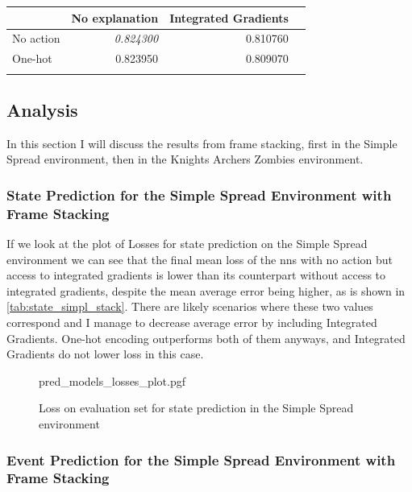 \documentclass[UKenglish]{uiomasterthesis}
\begin{document}
\begin{center}
\label{tab:state_kaz_knight_stack}
\begin{tabular}{lrrr}
\toprule
 & No explanation & Integrated Gradients \\
\midrule
No action & \textit{0.824300} & 0.810760 \\
One-hot & 0.823950 & 0.809070 \\
\bottomrule
\addlinespace[2pt]
\multicolumn{3}{l}{\textsuperscript{***}$p<0.001$, 
  \textsuperscript{**}$p<0.01$, 
  \textsuperscript{*}$p<0.05$}
\end{tabular}
\end{center}


\subsection{Analysis}
In this section I will discuss the results from frame stacking, first in the Simple Spread environment, then in the Knights Archers Zombies environment.


\subsubsection{State Prediction for the Simple Spread Environment with Frame Stacking}

If we look at the plot of Losses for state prediction on the Simple Spread environment we can see that the final mean loss of the \acp{nn} with no action but access to integrated gradients is lower than its counterpart without access to integrated gradients, despite the mean average error being higher, as is shown in \cref{tab:state_simpl_stack}. There are likely scenarios where these two values correspond and I manage to decrease average error by including Integrated Gradients. One-hot encoding outperforms both of them anyways, and Integrated Gradients do not lower loss in this case.

\begin{figure}[hbtp]
    \centering
    {pred_models_losses_plot.pgf}
    \caption{Loss on evaluation set for state prediction in the Simple Spread environment}
	\label{fig:pred_losses_stack}
\end{figure}

\subsubsection{Event Prediction for the Simple Spread Environment with Frame Stacking}
\end{document}
